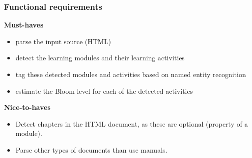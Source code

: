 \documentclass[a4paper,12pt]{article}
\begin{document}
\subsubsection{Functional requirements}
\textbf{Must-haves}
\begin{itemize}
    \item parse the input source (HTML)
    \item detect the learning modules and their learning activities
    \item tag these detected modules and activities based on named entity recognition
    \item estimate the Bloom level for each of the detected activities
\end{itemize}
\textbf{Nice-to-haves}
\begin{itemize}
    \item Detect chapters in the HTML document, as these are optional (property of a module).
    \item Parse other types of documents than use manuals.
\end{itemize}
\end{document}
